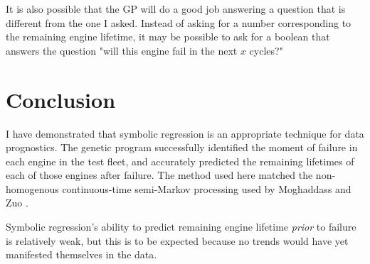 \documentclass{acm_proc_article-sp}
\begin{document}
It is also possible that the GP will do a good job answering a question that is different from the one I asked. Instead of asking for a number corresponding to the remaining engine lifetime, it may be possible to ask for a boolean that answers the question "will this engine fail in the next $x$ cycles?"

\section{Conclusion}
I have demonstrated that symbolic regression is an appropriate technique for data prognostics. The genetic program successfully identified the moment of failure in each engine in the test fleet, and accurately predicted the remaining lifetimes of each of those engines after failure. The method used here matched the non-homogenous continuous-time semi-Markov processing used by Moghaddass and Zuo \cite{Mog}.

Symbolic regression's ability to predict remaining engine lifetime {\it{prior}} to failure is relatively weak, but this is to be expected because no trends would have yet manifested themselves in the data.
\end{document}
